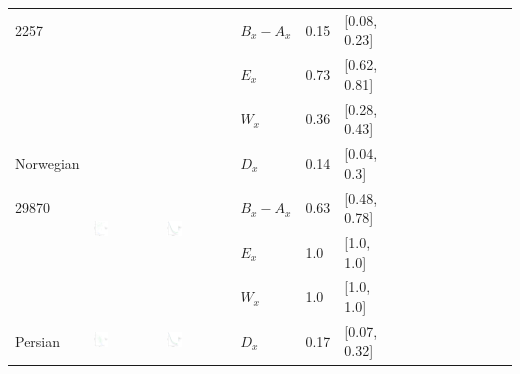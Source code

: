 \documentclass[11pt,letterpaper]{article}
\begin{document}
\begin{longtable}{lllllllllllllll}
2257  &    &    &  $B_x-A_x$  &  0.15  &  [0.08, 0.23]  \\ 
  &    &    &  $E_x$  &  0.73  &  [0.62, 0.81]  \\ 
  &    &    &  $W_x$  &  0.36  &  [0.28, 0.43]  \\ [10.25ex] \hline
Norwegian  &  \multirow{4}{*}{\includegraphics[width=0.25\textwidth]{figures/Norwegian-entropy-memory.pdf}}  &  \multirow{4}{*}{\includegraphics[width=0.25\textwidth]{figures/Norwegian-listener-surprisal-memory.pdf}}  &  $D_x$  &  0.14  &  [0.04, 0.3]  \\ 
29870  &    &    &  $B_x-A_x$  &  0.63  &  [0.48, 0.78]  \\ 
  &    &    &  $E_x$  &  1.0  &  [1.0, 1.0]  \\ 
  &    &    &  $W_x$  &  1.0  &  [1.0, 1.0]  \\ [10.25ex] \hline
Persian  &  \multirow{4}{*}{\includegraphics[width=0.25\textwidth]{figures/Persian-entropy-memory.pdf}}  &  \multirow{4}{*}{\includegraphics[width=0.25\textwidth]{figures/Persian-listener-surprisal-memory.pdf}}  &  $D_x$  &  0.17  &  [0.07, 0.32]  \\ 

\end{longtable}
\end{document}
